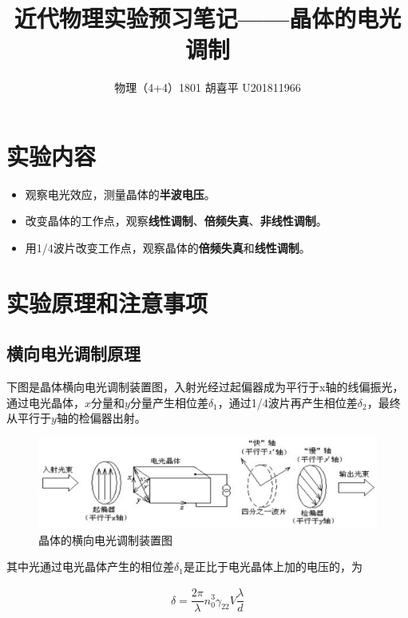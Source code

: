 \documentclass{article}
\author{物理（4+4）1801 \quad  胡喜平 \quad U201811966}
\affil{个人网站 https://hxp.plus/ \quad 电子邮件 hxp201406@gmail.com}
\title{近代物理实验预习笔记——晶体的电光调制}
\begin{document}
\maketitle\thispagestyle{fancy}

\section{实验内容}

\begin{itemize}
\item 观察电光效应，测量晶体的\textbf{半波电压}。
\item 改变晶体的工作点，观察\textbf{线性调制}、\textbf{倍频失真}、\textbf{非线性调制}。
\item 用1/4波片改变工作点，观察晶体的\textbf{倍频失真}和\textbf{线性调制}。
\end{itemize}

\section{实验原理和注意事项}

\subsection{横向电光调制原理}

下图是晶体横向电光调制装置图，入射光经过起偏器成为平行于x轴的线偏振光，通过电光晶体，$x$分量和$y$分量产生相位差$\delta_1$，通过1/4波片再产生相位差$\delta_2$，最终从平行于$y$轴的检偏器出射。

\begin{figure}[H]
  \centering
  \includegraphics[width=0.9\linewidth]{figures/晶体的横向电光调制}
  \caption{晶体的横向电光调制装置图}
\end{figure}

其中光通过电光晶体产生的相位差$\delta_1$是正比于电光晶体上加的电压的，为

\begin{equation*}
  \begin{aligned}
    \delta = \dfrac{2 \pi}{\lambda} n_0^3 \gamma_{22} V \dfrac{\lambda}{d}  
  \end{aligned}
\end{equation*}
\end{document}
